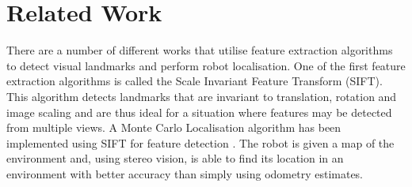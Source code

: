 \documentclass[11pt]{report}
\begin{document}
%
%
%
%
%


\section{Related Work}
\label{sec:relatedWork}
There are a number of different works that utilise feature extraction algorithms to detect visual landmarks and perform robot localisation. One of the first feature extraction algorithms is called the Scale Invariant Feature Transform (SIFT)\cite{Lowe1999}. This algorithm detects landmarks that are invariant to translation, rotation and image scaling and are thus ideal for a situation where features may be detected from multiple views. A Monte Carlo Localisation algorithm has been implemented using SIFT for feature detection \cite{Gil}. The robot is given a map of the environment and, using stereo vision, is able to find its location in an environment with better accuracy than simply using odometry estimates.\\
\end{document}
